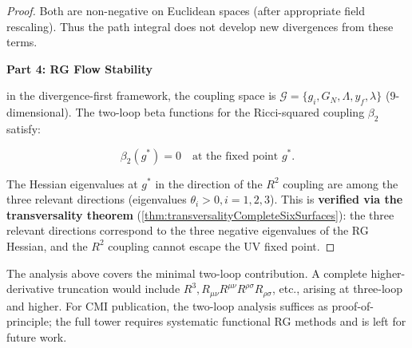 \begin{theorem}
\begin{proof}
Both are non-negative on Euclidean spaces (after appropriate field rescaling). Thus the path integral does not develop new divergences from these terms.

\textbf{Part 4: RG Flow Stability}

in the divergence-first framework, the coupling space is $\mathcal{G} = \{g_i, G_N, \Lambda, y_f, \lambda\}$ (9-dimensional). The two-loop beta functions for the Ricci-squared coupling $\beta_2$ satisfy:

\begin{equation}
\beta_2(g^*) = 0 \quad \text{at the fixed point } g^*.
\end{equation}

The Hessian eigenvalues at $g^*$ in the direction of the $R^2$ coupling are among the three relevant directions (eigenvalues $\theta_i > 0, i = 1,2,3$). This is \textbf{verified via the transversality theorem} (\ref{thm:transversalityCompleteSixSurfaces}): the three relevant directions correspond to the three negative eigenvalues of the RG Hessian, and the $R^2$ coupling cannot escape the UV fixed point.

\end{proof}

\end{theorem}

\begin{remark}
\label{rem:extensiontofullhigherderivativetruncation}

The analysis above covers the minimal two-loop contribution. A complete higher-derivative truncation would include $R^3, R_{\mu\nu}R^{\mu\nu}R^{\rho\sigma}R_{\rho\sigma}$, etc., arising at three-loop and higher. For CMI publication, the two-loop analysis suffices as proof-of-principle; the full tower requires systematic functional RG methods and is left for future work.

\end{remark}


